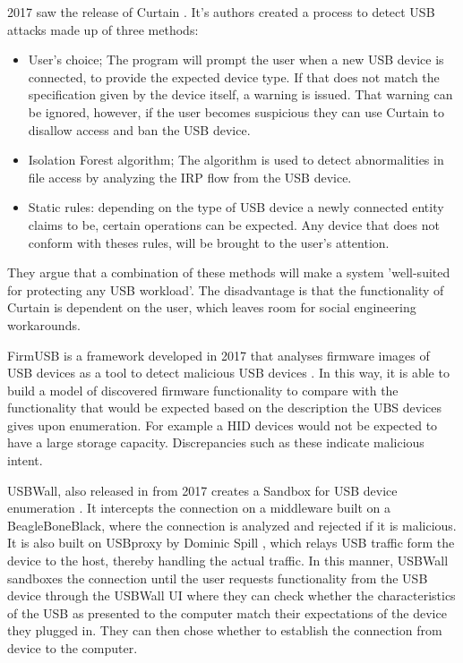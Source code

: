 2017 saw the release of Curtain \cite{fuCurtainKeepYour2017}. It's authors created a process to detect USB attacks made up of three methods:
\begin{itemize}
    \item User's choice; The program will prompt the user when a new USB device is connected, to provide the expected device type. If that does not match the specification given by the device itself, a warning is issued. That warning can be ignored, however, if the user becomes suspicious they can use Curtain to disallow access and ban the USB device.
    \item Isolation Forest algorithm; The algorithm is used to detect abnormalities in file access by analyzing the IRP flow from the USB device. 
    \item Static rules: depending on the type of USB device a newly connected entity claims to be, certain operations can be expected. Any device that does not conform with theses rules, will be brought to the user's attention. 
\end{itemize}
They argue that a combination of these methods will make a system 'well-suited for protecting any USB workload'.  The disadvantage is that the functionality of Curtain is dependent on the user, which leaves room for social engineering workarounds.  

FirmUSB is a framework developed in 2017 that analyses firmware images of USB devices as a tool to detect malicious USB devices \cite{hernandezFirmUSBVettingUSB2017}. In this way, it is able to build a model of discovered firmware functionality to compare with the functionality that would be expected based on the description the UBS devices gives upon enumeration. For example a HID devices would not be expected to have a large storage capacity. Discrepancies such as these indicate malicious intent. 

USBWall, also released in from 2017 creates a Sandbox for USB device enumeration \cite{kangUSBWallNovelSecurity2017}. It intercepts the connection on a middleware built on a BeagleBoneBlack, where the connection is analyzed and rejected if it is malicious. It is also built on USBproxy by Dominic Spill \cite{dominicspillShmooCon2014Open2014}, which relays USB traffic form the device to the host, thereby handling the actual traffic. In this manner, USBWall sandboxes the connection until the user requests functionality from the USB device through the USBWall UI where they can check whether the characteristics of the USB as presented to the computer match their expectations of the device they plugged in. They can then chose whether to establish the connection from device to the computer.  

